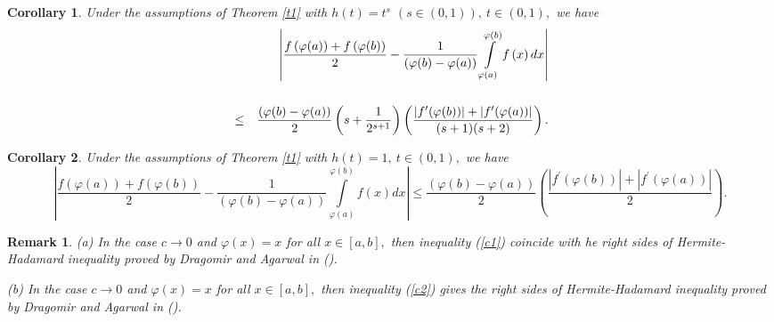 \documentclass{amsart}
\theoremstyle{plain}
\newtheorem{corollary}{Corollary}
\newtheorem{remark}{Remark}
\numberwithin{equation}{section}
\begin{document}
\begin{corollary}
Under the assumptions of Theorem \ref{t1} with $h(t)=t^{s}$ $(s\in \left(
0,1\right) ),\ t\in \left( 0,1\right) ,$ we have\begin{eqnarray}
&&\left\vert \frac{f\left( \varphi (a)\right) +f\left( \varphi (b)\right) }{2}-\frac{1}{(\varphi (b)-\varphi (a))}\int\limits_{\varphi (a)}^{\varphi
(b)}f\left( x\right) dx\right\vert   \label{c2} \\
&&  \notag \\
&\leq &\frac{(\varphi (b)-\varphi (a))}{2}\left( s+\frac{1}{2^{s+1}}\right)
\left( \frac{\left\vert f^{\prime }(\varphi (b))\right\vert +\left\vert
f^{\prime }(\varphi (a))\right\vert }{(s+1)(s+2)}\right) .  \notag
\end{eqnarray}
\end{corollary}

\begin{corollary}
Under the assumptions of Theorem \ref{t1} with $h(t)=1,\ t\in \left(
0,1\right) ,$ we have\begin{equation}
\left\vert \frac{f\left( \varphi (a)\right) +f\left( \varphi (b)\right) }{2}-\frac{1}{(\varphi (b)-\varphi (a))}\int\limits_{\varphi (a)}^{\varphi
(b)}f\left( x\right) dx\right\vert \leq \frac{(\varphi (b)-\varphi (a))}{2}\left( \frac{\left\vert f^{\prime }(\varphi (b))\right\vert +\left\vert
f^{\prime }(\varphi (a))\right\vert }{2}\right) .  \label{c3}
\end{equation}
\end{corollary}

\begin{remark}
(a) In the case $c\rightarrow 0$ and $\varphi (x)=x$ for all $x\in \left[ a,b\right] ,$ then inequality (\ref{c1}) coincide with he right sides of
Hermite-Hadamard inequality proved by Dragomir and Agarwal in (\cite{dragomir2}).

(b) In the case $c\rightarrow 0$ and $\varphi (x)=x$ for all $x\in \left[ a,b\right] ,$ then inequality (\ref{c2}) gives the right sides of
Hermite-Hadamard inequality proved by Dragomir and Agarwal in (\cite{dragomir2}).
\end{remark}
\end{document}
